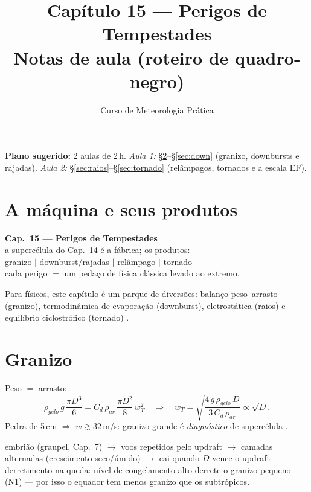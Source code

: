 \documentclass[11pt]{article}
\title{Capítulo 15 --- Perigos de Tempestades\\
{\large Notas de aula (roteiro de quadro-negro)}}
\author{Curso de Meteorologia Prática}
\date{}
\begin{document}
\maketitle
\thispagestyle{fancy}

\noindent\textbf{Plano sugerido:} 2 aulas de 2\,h.
\emph{Aula 1:} \S\ref{sec:granizo}--\S\ref{sec:down} (granizo,
downbursts e rajadas).
\emph{Aula 2:} \S\ref{sec:raios}--\S\ref{sec:tornado} (relâmpagos,
tornados e a escala EF).

\section{A máquina e seus produtos}

\begin{noquadro}[abertura]
\textbf{Cap.~15 --- Perigos de Tempestades}\\[2pt]
a supercélula do Cap.~14 é a fábrica; os produtos:\\
granizo \quad $|$ \quad downburst/rajadas \quad $|$ \quad relâmpago
\quad $|$ \quad tornado\\[2pt]
cada perigo $=$ um pedaço de física clássica levado ao extremo.
\end{noquadro}

Para físicos, este capítulo é um parque de diversões: balanço
peso--arrasto (granizo), termodinâmica de evaporação (downburst),
eletrostática (raios) e equilíbrio ciclostrófico (tornado)
.

\section{Granizo}\label{sec:granizo}


\begin{formadif}
Peso $=$ arrasto:
\[ \rho_{gelo}\,g\,\frac{\pi D^3}{6} =
C_d\,\rho_{ar}\,\frac{\pi D^2}{8}\,w_T^2
\quad\Longrightarrow\quad
w_T = \sqrt{\frac{4\,g\,\rho_{gelo}\,D}{3\,C_d\,\rho_{ar}}}
\propto \sqrt{D}. \]
Pedra de 5\,cm $\Rightarrow$ $w \gtrsim 32$\,m/s: granizo grande é
\emph{diagnóstico} de supercélula .
\end{formadif}

\begin{noquadro}
embrião (graupel, Cap.~7) $\to$ voos repetidos pelo updraft $\to$
camadas alternadas (crescimento seco/úmido) $\to$ cai quando
$D$ vence o updraft\\[2pt]
derretimento na queda: nível de congelamento alto derrete o granizo
pequeno (N1) — por isso o equador tem menos granizo que os
subtrópicos.
\end{noquadro}
\end{document}
